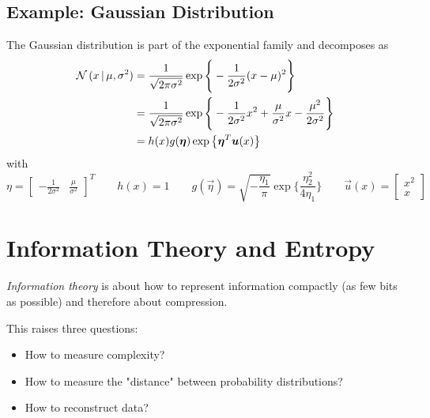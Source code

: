 		\subsection{Example: Gaussian Distribution}
			The Gaussian distribution is part of the exponential family and decomposes as
			\begin{align}
				\mathcal{N}\,(x \,\vert\, \mu, \sigma^2) & = \frac{1}{\sqrt{2\pi\sigma^2}} \exp\Bigg\{ -\frac{1}{2\sigma^2} (x - \mu)^2 \Bigg\}                                            \\
				                                      & = \frac{1}{\sqrt{2\pi\sigma^2}} \exp\Bigg\{ -\frac{1}{2\sigma^2} x^2 + \frac{\mu}{\sigma^2} x - \frac{\mu^2}{2\sigma^2} \Bigg\} \\
				                                      & = h(x) g(\bm{\eta}) \exp\big\{ \bm{\eta}^T \bm{u}(x) \big\}
			\end{align}
			with
			\begin{equation}
				\eta = \begin{bmatrix} -\frac{1}{2\sigma^2} & \frac{\mu}{\sigma^2} \end{bmatrix}^T \qquad h(x) = 1 \qquad g(\vec{\eta}) = \sqrt{-\frac{\eta_1}{\pi}} \exp \Bigg\{ \frac{\eta_2^2}{4\eta_1} \Bigg\} \qquad \vec{u}(x) = \begin{bmatrix} x^2 \\ x \end{bmatrix}
			\end{equation}

	\section{Information Theory and Entropy}
		\emph{Information theory} is about how to represent information compactly (as few bits as possible) and therefore about compression.

		This raises three questions:
		\begin{itemize}
			\item How to measure complexity?
			\item How to measure the "distance" between probability distributions?
			\item How to reconstruct data?
		\end{itemize}


